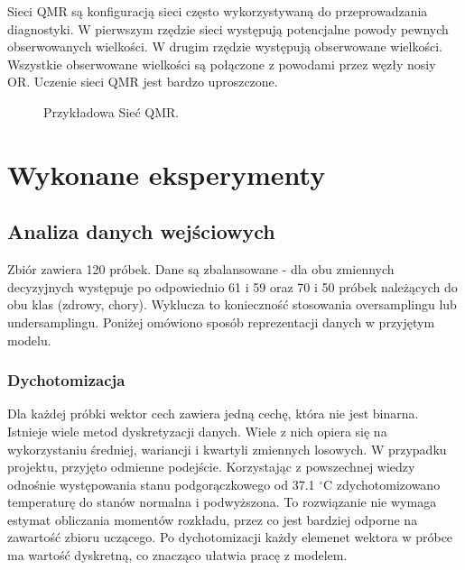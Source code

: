 \documentclass{article}
\begin{document}
Sieci QMR są konfiguracją sieci często wykorzystywaną do przeprowadzania diagnostyki. W pierwszym rzędzie sieci występują potencjalne powody pewnych obserwowanych wielkości. W drugim rzędzie występują obserwowane wielkości. Wszystkie obserwowane wielkości są połączone z powodami przez węzły nosiy OR. Uczenie sieci QMR jest bardzo uproszczone.

\begin{figure}[H]
\centering
{}
\caption{Przykładowa Sieć QMR.}
\end{figure}

\section{Wykonane eksperymenty}

\subsection{Analiza danych wejściowych}

Zbiór zawiera 120 próbek. Dane są zbalansowane - dla obu zmiennych decyzyjnych występuje po odpowiednio 61 i 59 oraz 70 i 50 próbek należących do obu klas (zdrowy, chory). Wyklucza to konieczność stosowania oversamplingu lub undersamplingu. Poniżej omówiono sposób reprezentacji danych w przyjętym modelu.

\subsubsection{Dychotomizacja}
Dla każdej próbki wektor cech zawiera jedną cechę, która nie jest binarna. Istnieje wiele metod dyskretyzacji danych. Wiele z nich opiera się na wykorzystaniu średniej, wariancji i kwartyli zmiennych losowych. W przypadku projektu, przyjęto odmienne podejście. Korzystając z powszechnej wiedzy odnośnie występowania stanu podgorączkowego od 37.1 $^{\circ}$C zdychotomizowano temperaturę do stanów normalna i podwyższona. To rozwiązanie nie wymaga estymat obliczania momentów rozkładu, przez co jest bardziej odporne na zawartość zbioru uczącego. Po dychotomizacji każdy elemenet wektora w próbce ma wartość dyskretną, co znacząco ułatwia pracę z modelem.
\end{document}
